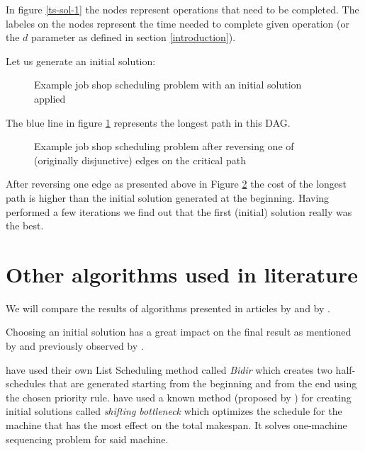 \documentclass[14pt]{article}
\begin{document}
In figure \ref{ts-sol-1} the nodes represent operations that need to be completed. The labeles on the nodes represent the time needed to complete given operation (or the $d$ parameter as defined in section \ref{introduction}).

Let us generate an initial solution:

\begin{figure}[H]
  \centering
  \def\svgwidth{0.5\columnwidth}
  
  \caption{Example job shop scheduling problem with an initial solution applied}
  \label{ts-sol-2}
\end{figure}

The blue line in figure \ref{ts-sol-2} represents the longest path in this DAG.

\begin{figure}[H]
  \centering
  \def\svgwidth{0.5\columnwidth}
  
  \caption{Example job shop scheduling problem after reversing one of (originally disjunctive) edges on the critical path}
  \label{ts-sol-3}
\end{figure}

After reversing one edge as presented above in Figure \ref{ts-sol-3} the cost of the longest path is higher than the initial solution generated at the beginning.
Having performed a few iterations we find out that the first (initial) solution really was the best.

\section{Other algorithms used in literature}\label{other-algs}

We will compare the results of algorithms presented in articles by \citet{amico-trubian} and by \citet{pezzella}.

Choosing an initial solution has a great impact on the final result as mentioned by \citet{pezzella} and previously observed by .

\citet{amico-trubian} have used their own List Scheduling method called \textit{Bidir} which creates two half-schedules that are generated starting from the beginning and from the end using the chosen priority rule.
\citet{pezzella} have used a known method (proposed by \citet{adams}) for creating initial solutions called \textit{shifting bottleneck} which optimizes the schedule for the machine that has the most effect on the total makespan. It solves one-machine sequencing problem for said machine.
\end{document}

